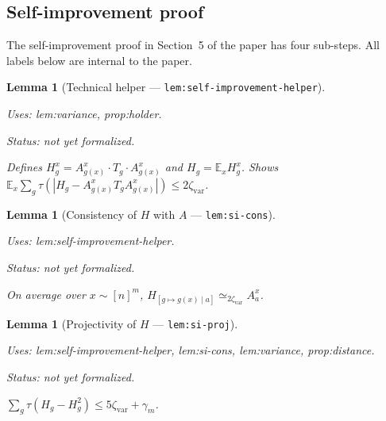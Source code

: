 \documentclass{article}
\providecommand{\uses}[1]{\par\smallskip\noindent\emph{Uses:} #1.\par\smallskip}
\providecommand{\notready}{\par\smallskip\noindent\emph{Status: not yet formalized.}\par\smallskip}
\newtheorem{lemma}[definition]{Lemma}
\theoremstyle{remark}
\newcommand{\E}{\mathbb{E}}
\begin{document}
\subsection{Self-improvement proof}

The self-improvement proof in Section~5 of the paper has four sub-steps.
All labels below are internal to the paper.

\begin{lemma}[Technical helper --- \texttt{lem:self-improvement-helper}]
	\label{lem:self-improvement-helper}
	\uses{lem:variance, prop:holder}
	\notready
	Defines $H^x_g=A^x_{g(x)}\cdot T_g\cdot A^x_{g(x)}$ and
	$H_g=\E_x H^x_g$. Shows
	$\E_x\sum_g\tau(|H_g-A^x_{g(x)}T_gA^x_{g(x)}|)\le 2\zeta_{\mathrm{var}}$.
\end{lemma}

\begin{lemma}[Consistency of $H$ with $A$ --- \texttt{lem:si-cons}]
	\label{lem:si-cons}
	\uses{lem:self-improvement-helper}
	\notready
	On average over $x\sim[n]^m$,
	$H_{[g\mapsto g(x)\mid a]}\simeq_{2\zeta_{\mathrm{var}}} A^x_a$.
\end{lemma}

\begin{lemma}[Projectivity of $H$ --- \texttt{lem:si-proj}]
	\label{lem:si-proj}
	\uses{lem:self-improvement-helper, lem:si-cons, lem:variance, prop:distance}
	\notready
	$\sum_g\tau(H_g-H_g^2)\le 5\zeta_{\mathrm{var}}+\gamma_m$.
\end{lemma}
\end{document}
